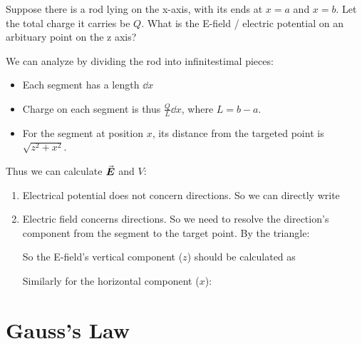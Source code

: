 \documentclass[class=article, crop=false, 12pt]{standalone}
\begin{document}
\newpage
\begin{example}
    Suppose there is a rod lying on the x-axis, 
    with its ends at $x=a$ and $x=b$.
    Let the total charge it carries be $Q$.
    What is the E-field / electric potential on an arbituary point on the z axis?\\


    We can analyze by dividing the rod into infinitestimal pieces:
    \begin{itemize}
        \item Each segment has a length $\dd{x}$
        \item Charge on each segment is thus $\frac{Q}{L}\dd{x}$, where $L=b-a$.
        \item For the segment at position $x$, 
        its distance from the targeted point is $\sqrt{z^2+x^2}$.
    \end{itemize}


    Thus we can calculate $\va*{E}$ and $V$:
    \begin{enumerate}
        \item Electrical potential does not concern directions.
        So we can directly write

        \item Electric field concerns directions.
        So we need to resolve the direction's component from the segment to the target point. 
        By the triangle:
        

        So the E-field's vertical component ($z$) should be calculated as 

        Similarly for the horizontal component ($x$):

    \end{enumerate}

\end{example}

\linesep
\section{Gauss's Law}
\end{document}
